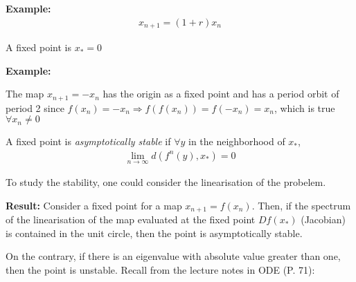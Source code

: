 \noindent\textbf{Example:}
\begin{equation*}
  \begin{gathered}
    x_{n+1} = (1+r)x_n
  \end{gathered}
\end{equation*}\par
\noindent A fixed point is $x_* = 0$
\par\bigskip
\noindent\textbf{Example:}\par
\noindent The map $x_{n+1} = -x_n$ has the origin as a fixed point and has a period orbit of period 2 since $f(x_n) = -x_n\Rightarrow f(f(x_n)) = f(-x_n) = x_n$, which is true $\forall x_n\neq0$ 
\par\bigskip
\begin{theo}{}
  A fixed point is \textit{asymptotically stable} if $\forall y$ in the neighborhood of $x_*$,
  \begin{equation*}
    \begin{gathered}
      \lim_{n\to\infty}d(f^n(y), x_*)  = 0
    \end{gathered}
  \end{equation*}
\end{theo}
\par\bigskip
\noindent To study the stability, one could consider the linearisation of the probelem.
\par\bigskip
\noindent\textbf{Result:} Consider a fixed point for a map $x_{n+1} = f(x_n)$. Then, if the spectrum of the linearisation of the map evaluated at the fixed point $Df(x_*)$ (Jacobian) is contained in the unit circle, then the point is asymptotically stable. 
\par\bigskip
\noindent On the contrary, if there is an eigenvalue with absolute value greater than one, then the point is unstable. Recall from the lecture notes in ODE (P. 71):
\par\bigskip
